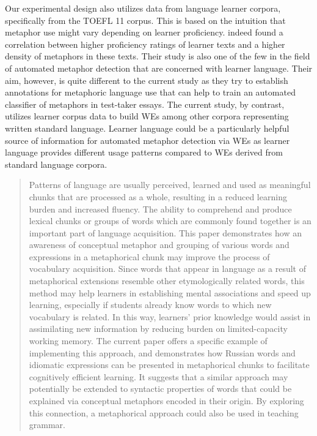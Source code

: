 \documentclass[11pt,a4paper]{article}
\begin{document}
Our experimental design also utilizes data from language learner corpora, specifically from the TOEFL 11 corpus\cite{ETS2:ETS202331}. This is based on the intuition that metaphor use might vary depending on learner proficiency.
 indeed found a correlation between higher proficiency ratings of learner texts and a higher density of metaphors in these texts. Their study is also one of the few in the field of automated metaphor detection that are concerned with learner language. Their aim, however, is quite different to the current study as they try to establish annotations for metaphoric language use that can help to train an automated classifier of metaphors in test-taker essays. The current study, by contrast, utilizes learner corpus data to build WEs among other corpora representing written standard language. Learner language could be a particularly helpful source of information for automated metaphor detection via WEs as learner language provides different usage patterns compared to WEs derived from standard language corpora.


\begin{quotation}
Patterns of language are usually perceived, learned and used as meaningful chunks that are processed as a whole, resulting in a reduced learning burden and increased fluency. The ability to comprehend and produce lexical chunks or groups of words which are commonly found together is an important part of language acquisition. This paper demonstrates how an awareness of conceptual metaphor and grouping of various words and expressions in a metaphorical chunk may improve the process of vocabulary acquisition. Since words that appear in language as a result of metaphorical extensions resemble other etymologically related words, this method may help learners in establishing mental associations and speed up learning, especially if students already know words to which new vocabulary is related. In this way, learners' prior knowledge would assist in assimilating new information by reducing burden on limited-capacity working memory. The current paper offers a specific example of implementing this approach, and demonstrates how Russian words and idiomatic expressions can be presented in metaphorical chunks to facilitate cognitively efficient learning. It suggests that a similar approach may potentially be extended to syntactic properties of words that could be explained via conceptual metaphors encoded in their origin. By exploring this connection, a metaphorical approach could also be used in teaching grammar.
\end{quotation}
\cite{Kalyuga2008}
\end{document}
